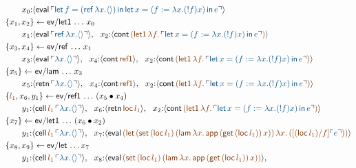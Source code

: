 \begin{sidewaysfigure}[p]\label{fig:bigbackpatch}\small
\begin{align*}
&\qquad 
x_0{:}\susp{{\sf eval}\,
  \interp{{\sf let}\,f = ({\sf ref}\,\lambda x. \langle\rangle) \,{\sf in}\,
          {\sf let}\,x = (f := \lambda x. ({!}f) x)\,{\sf in}\,e}}
\\
& \trstep{x_1,x_2}{{\sf ev/let1}\,\ldots\,x_0}
\\
&\qquad
x_1{:}\susp{{\sf eval}\,\interp{{\sf ref}\,\lambda x. \langle\rangle}}, ~~
x_2{:}\susp{{\sf cont}\,
  \lf{({\sf let1}\,\lambda f.\,
  \interp{{\sf let}\, x = (f := \lambda x. ({!}f) x)\,{\sf in}\,e})}}
\\
& \trstep{x_3, x_4}{{\sf ev/ref}\,\ldots\,x_1}
\\
&\qquad
x_3{:}\susp{{\sf eval}\,\interp{\lambda x. \langle\rangle}}, ~~
x_4{:}\susp{{\sf cont}\,\lf{\sf ref1}}, ~~
x_2{:}\susp{{\sf cont}\,
  \lf{({\sf let1}\,\lambda f.\,
  \interp{{\sf let}\, x = (f := \lambda x. ({!}f) x)\,{\sf in}\,e})}}
\\
& \trstep{x_5}{{\sf ev/lam}\,\ldots\,x_3}
\\
&\qquad 
x_5{:}\susp{{\sf retn}\,\interp{\lambda x. \langle\rangle}}, ~~
x_4{:}\susp{{\sf cont}\,\lf{\sf ref1}}, ~~
x_2{:}\susp{{\sf cont}\,
  \lf{({\sf let1}\,\lambda f.\,
  \interp{{\sf let}\, x = (f := \lambda x. ({!}f) x)\,{\sf in}\,e})}}
\\
& \trstep{\lf{l_1}, x_6,y_1}{{\sf ev/ref1}\,\ldots\,(\tfuser{x_5}{x_4})}
\\
&\qquad
y_1{:}\susp{{\sf cell}\,\lf{l_1}\,\interp{\lambda x. \langle\rangle}}, ~~
x_6{:}\susp{{\sf retn}\,\lf{{\sf loc}\,l_1}}, ~~
x_2{:}\susp{{\sf cont}\,
  \lf{({\sf let1}\,\lambda f.\,
  \interp{{\sf let}\, x = (f := \lambda x. ({!}f) x)\,{\sf in}\,e})}}
\\
& \trstep{x_7}{{\sf ev/let1}\,\ldots\,(\tfuser{x_6}{x_2})}
\\
&\qquad
y_1{:}\susp{{\sf cell}\,\lf{l_1}\,\interp{\lambda x. \langle\rangle}}, ~~
x_7{:}\susp{{\sf eval}\,
  \lf{({\sf let}\,({\sf set}\,\lf{({\sf loc}\,l_1)}\,({\sf lam}\,\lambda x.\,{\sf app}\,({\sf get}\,({\sf loc}\,l_1))\,x))\,\lambda x.\,([({\sf loc}\,l_1)/f]\interp{e}))}}
\\
& \trstep{x_8,x_9}{{\sf ev/let}\,\ldots x_7}
\\
&\qquad
y_1{:}\susp{{\sf cell}\,\lf{l_1}\,\interp{\lambda x. \langle\rangle}}, ~~
x_8{:}\susp{{\sf eval}\,
  \lf{({\sf set}\,\lf{({\sf loc}\,l_1)}\,({\sf lam}\,\lambda x.\,{\sf app}\,({\sf get}\,({\sf loc}\,l_1))\,x))}}, ~~

\end{align*}
\end{sidewaysfigure}
